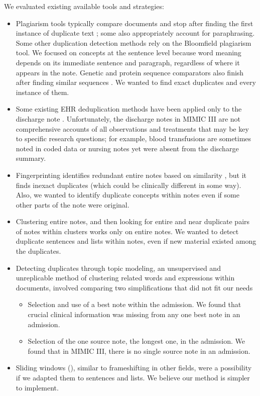 \documentclass[runningheads,a4paper]{llncs}
\begin{document}
\medskip

\noindent We evaluated existing available tools and strategies:
\begin{itemize}
\item
Plagiarism tools typically compare documents and stop after finding the first instance of duplicate text \cite{Su:2008} \cite{copyfind} \cite{Ceglarek:2013}; some also appropriately account for paraphrasing. Some other duplication detection methods \cite{Thielke:2007} \cite{Wrenn:2010} rely on the Bloomfield plagiarism tool. We focused on concepts at the sentence level because word meaning depends on its immediate sentence and paragraph, regardless of where it appears in the note. Genetic and protein sequence comparators also finish after finding similar sequences \cite{Altschul:1990}. We wanted to find exact duplicates and every instance of them.
\medskip
\item
Some existing EHR deduplication methods have been applied only to the discharge note \cite{Cohen:2013}. Unfortunately, the discharge notes in MIMIC III are not comprehensive accounts of all observations and treatments that may be key to specific research questions; for example, blood transfusions are sometimes noted in coded data or nursing notes yet were absent from the discharge summary.
\medskip
\item
Fingerprinting identifies redundant entire notes based on similarity \cite{Cohen:2013}, but it finds inexact duplicates (which could be clinically different in some way). Also, we wanted to identify duplicate concepts within notes even if some other parts of the note were original.
\medskip

\item
Clustering entire notes, and then looking for entire and near duplicate pairs of notes within clusters \cite{Gabriel:2018} works only on entire notes. We wanted to detect duplicate sentences and lists within notes, even if new material existed among the duplicates.
\medskip

\item
Detecting duplicates through topic modeling, an unsupervised and unreplicable \cite{Lancichinetti:2015} method of clustering related words and expressions within documents, \cite{Cohen:2014} involved comparing two simplifications that did not fit our needs

\begin{itemize}
\medskip

\item
Selection and use of a best note within the admission. We found that crucial clinical information was missing from any one best note in an admission.
\medskip

\item
Selection of the one source note, the longest one, in the admission.  We found that in MIMIC III, there is no single source note in an admission.
\end{itemize}
\medskip

\item
Sliding windows (\cite{Zhang:2011}), similar to frameshifting in other fields, were a possibility if we adapted them to sentences and lists. We believe our method is simpler to implement.
\end{itemize}
\bigskip
\end{document}
